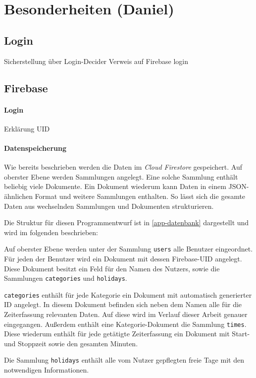 \section{Besonderheiten (Daniel)}
\subsection{Login}
Sicherstellung über Login-Decider
Verweis auf Firebase login

\subsection{Firebase}
\paragraph{Login}
Erklärung UID

\paragraph{Datenspeicherung}
Wie bereits beschrieben werden die Daten im \textit{Cloud Firestore} gespeichert.
Auf oberster Ebene werden Sammlungen angelegt.
Eine solche Sammlung enthält beliebig viele Dokumente.
Ein Dokument wiederum kann Daten in einem JSON-ähnlichen Format und weitere Sammlungen enthalten.
So lässt sich die gesamte Daten aus wechselnden Sammlungen und Dokumenten strukturieren.

Die Struktur für diesen Programmentwurf ist in \autoref{app-datenbank} dargestellt und wird im folgenden beschrieben:

Auf oberster Ebene werden unter der Sammlung \texttt{users} alle Benutzer eingeordnet.
Für jeden der Benutzer wird ein Dokument mit dessen Firebase-UID angelegt.
Diese Dokument besitzt ein Feld für den Namen des Nutzers,
sowie die Sammlungen \texttt{categories} und \texttt{holidays}.

\texttt{categories} enthält für jede Kategorie ein Dokument mit automatisch generierter ID angelegt.
In diesem Dokument befinden sich neben dem Namen alle für die Zeiterfassung relevanten Daten.
Auf diese wird im Verlauf dieser Arbeit genauer eingegangen.
Außerdem enthält eine Kategorie-Dokument die Sammlung \texttt{times}.
Diese wiederum enthält für jede getätigte Zeiterfassung ein Dokument mit Start- und Stoppzeit sowie den gesamten Minuten.

Die Sammlung \texttt{holidays} enthält alle vom Nutzer gepflegten freie Tage mit den notwendigen Informationen.

